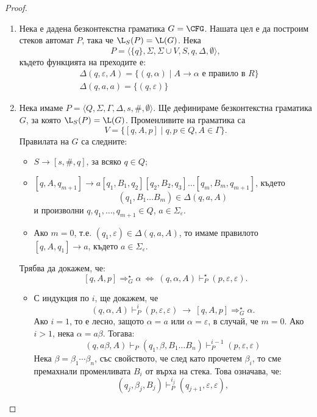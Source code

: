 \begin{proof}
  \begin{enumerate}[1)]
  \item 
    Нека е дадена безконтекстна граматика $G = \CFG$.
    Нашата цел е да построим стеков автомат $P$, така че $\L_S(P) = \L(G)$.
    Нека  \[P = \langle{\{q\},\Sigma,\Sigma\cup V,S,q,\Delta,\emptyset}\rangle,\]
    където функцията на преходите е:
    \begin{align*}
      & \Delta(q,\varepsilon,A) = \{(q,\alpha)\mid A\to\alpha\mbox{ е правило в }R\}\\
      & \Delta(q,a,a) = \{(q,\varepsilon)\}
    \end{align*}
  \item
    Нека имаме $P = \langle{Q, \Sigma, \Gamma, \Delta, s, \#, \emptyset}\rangle$.
    Ще дефинираме безконтекстна граматика $G$, за която $\L_S(P) = \L(G)$.
    Променливите на граматика са 
    \[V = \{[q,A,p] \mid q,p \in Q, A \in \Gamma\}.\]
    Правилата на $G$ са следните:
    \begin{itemize}
    \item
      $S \to [s,\#,q]$, за всяко $q \in Q$;
    \item
      $[q,A,q_{m+1}] \to a[q_1,B_1,q_2][q_2,B_2,q_3]\dots [q_m,B_m,q_{m+1}]$,
      където 
      \[(q_1,B_1\dots B_m) \in \Delta(q, a, A)\]
      и произволни $q,q_1,\dots,q_{m+1} \in Q$,
      $a \in \Sigma_\varepsilon$.
    \item
      Ако $m = 0$, т.е. $(q_1,\varepsilon) \in \Delta(q, a, A)$,  то имаме правилото $[q,A,q_{1}] \to a$, където $a \in \Sigma_\varepsilon$.
    \end{itemize}
    Трябва да докажем, че:
    \[[q,A,p] \Rightarrow^\star_G \alpha\ \iff\ (q,\alpha,A) \vdash^\star_P (p,\varepsilon,\varepsilon).\]
    \begin{itemize}
    \item 
      С индукция по $i$, ще докажем, че 
      \[(q,\alpha,A) \vdash^i_P (p,\varepsilon,\varepsilon)\ \rightarrow\ [q,A,p] \Rightarrow^\star_G \alpha.\]
      Ако $i = 1$, то е лесно, защото $\alpha = a$ или $\alpha = \varepsilon$, в случай, че $m = 0$.
      Ако $i > 1$, нека $\alpha = a\beta$. Тогава:
      \[(q,a\beta,A) \vdash_P (q_1,\beta,B_1\dots B_n) \vdash^{i-1}_P (p, \varepsilon, \varepsilon)\]
      Нека $\beta = \beta_1\cdots \beta_n$, със свойството, че след като прочетем $\beta_i$, то 
      сме премахнали променливата $B_i$ от върха на стека. Това означава, че:
      \[(q_j, \beta_j, B_j) \vdash^{i_j}_P (q_{j+1},\varepsilon,\varepsilon),\]

\end{itemize}
\end{enumerate}
\end{proof}
